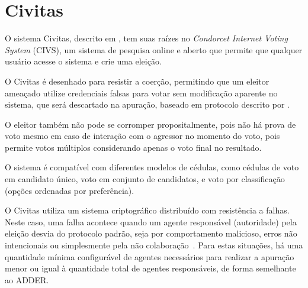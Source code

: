 \section{Civitas}

O sistema Civitas, descrito em \textcite{clarkson2008civitas}, tem suas raízes
no \textit{Condorcet Internet Voting System} (CIVS), um sistema de pesquisa
online e aberto que permite que qualquer usuário acesse o sistema e crie uma
eleição.

O Civitas é desenhado para resistir a coerção, permitindo que um eleitor
ameaçado utilize credenciais falsas para votar sem modificação aparente no
sistema, que será descartado na apuração, baseado em protocolo descrito por
\textcite{juels2005coercion}.

O eleitor também não pode se corromper propositalmente, pois não há prova de
voto mesmo em caso de interação com o agressor no momento do voto, pois permite
votos múltiplos considerando apenas o voto final no resultado.

O sistema é compatível com diferentes modelos de cédulas, como cédulas de voto
em candidato único, voto em conjunto de candidatos, e voto por classificação
(opções ordenadas por preferência).

O Civitas utiliza um sistema criptográfico distribuído com resistência a
falhas. Neste caso, uma falha acontece quando um agente responsável
(autoridade) pela eleição desvia do protocolo padrão, seja por comportamento
malicioso, erros não intencionais ou simplesmente pela não
colaboração~\cite{davis2008civitas}. Para estas situações, há uma quantidade
mínima configurável de agentes necessários para realizar a apuração menor ou
igual à quantidade total de agentes responsáveis, de forma semelhante ao ADDER.
